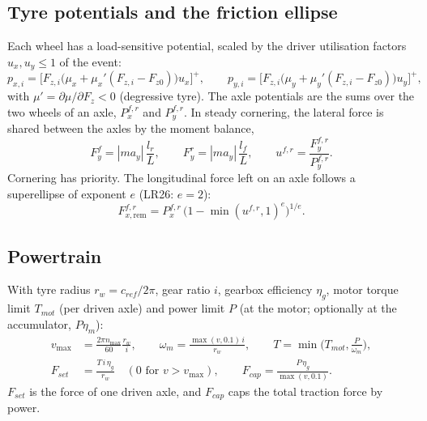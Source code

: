 \documentclass[11pt]{article}
\begin{document}
\subsection{Tyre potentials and the friction ellipse}
Each wheel has a load-sensitive potential, scaled by the driver utilisation factors $u_x, u_y\le 1$ of the event:
\begin{equation}
p_{x,i} = \Big[F_{z,i}\big(\mu_x + \mu_x'(F_{z,i}-F_{z0})\big)u_x\Big]^+,\qquad
p_{y,i} = \Big[F_{z,i}\big(\mu_y + \mu_y'(F_{z,i}-F_{z0})\big)u_y\Big]^+,
\label{eq:pot}
\end{equation}
with $\mu' = \partial\mu/\partial F_z<0$ (degressive tyre). The axle potentials are the sums over the two wheels
of an axle, $P_x^{f,r}$ and $P_y^{f,r}$. In steady cornering, the lateral force is shared between the axles by the
moment balance,
\begin{equation}
F_y^f = |m a_y|\,\frac{l_r}{L},\qquad F_y^r = |m a_y|\,\frac{l_f}{L},\qquad
u^{f,r} = \frac{F_y^{f,r}}{P_y^{f,r}} .
\end{equation}
Cornering has priority. The longitudinal force left on an axle follows a superellipse of exponent $e$
(LR26: $e=2$):
\begin{equation}
F_{x,\mathrm{rem}}^{f,r} = P_x^{f,r}\,\Big(1-\min(u^{f,r},1)^{e}\Big)^{1/e}.
\label{eq:ellipse}
\end{equation}

\subsection{Powertrain}
With tyre radius $r_w = c_{ref}/2\pi$, gear ratio $i$, gearbox efficiency $\eta_g$, motor torque limit $T_{mot}$
(per driven axle) and power limit $P$ (at the motor; optionally at the accumulator, $P\eta_m$):
\begin{align}
v_{\max} &= \frac{2\pi n_{\max}}{60}\frac{r_w}{i}, \qquad
\omega_m = \frac{\max(v, 0.1)\,i}{r_w}, \qquad
T = \min\!\Big(T_{mot},\frac{P}{\omega_m}\Big),\\
F_{set} &= \frac{T\,i\,\eta_g}{r_w}\quad(0\text{ for } v > v_{\max}),\qquad F_{cap} = \frac{P\,\eta_g}{\max(v,0.1)} .
\end{align}
$F_{set}$ is the force of one driven axle, and $F_{cap}$ caps the total traction force by power.
\end{document}
